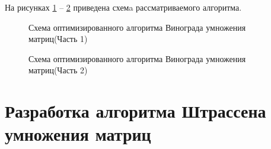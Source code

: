 На рисунках \ref{fig:optvinograd} -- \ref{fig:optvinograd2} приведена схемa рассматриваемого алгоритма.
\FloatBarrier
\begin{figure}[h]
	\caption{Схема оптимизированного алгоритма Винограда умножения матриц(Часть 1)}
	\label{fig:optvinograd}
\end{figure}
\FloatBarrier
\FloatBarrier
\begin{figure}[h]
	\caption{Схема оптимизированного алгоритма Винограда умножения матриц(Часть 2)}
	\label{fig:optvinograd2}
\end{figure}
\FloatBarrier
\clearpage
\section{Разработка алгоритма Штрассена умножения матриц}

